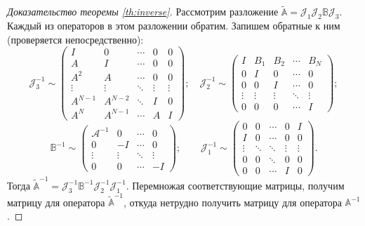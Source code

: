 \begin{proof}[Доказательство теоремы \ref{th:inverse}]
    Рассмотрим разложение $\widetilde{\mathbb A} = \mathcal J_1 \mathcal J_2 \mathbb B \mathcal J_3$. Каждый из операторов в этом разложении обратим. Запишем обратные к ним (проверяется непосредственно):
    \[\mathcal J_3^{-1} \sim \begin{pmatrix}
    I & 0 & \cdots & 0 & 0 \\
    A & I & \cdots & 0 & 0 \\
    A^2 & A & \cdots & 0 & 0 \\
    \vdots & \vdots & \ddots & \vdots & \vdots \\
    A^{N-1} & A^{N-2} & \ddots & I & 0 \\
    A^N & A^{N-1} & \cdots & A & I
   \end{pmatrix}; \quad
   \mathcal J_2^{-1} \sim \begin{pmatrix}
    I & B_1 & B_2 & \cdots & B_N \\
    0 & I & 0 & \cdots &  0 \\
    0 & 0 & I & \cdots &  0 \\
    \vdots & \vdots & \vdots &  \ddots & \vdots \\
    0 & 0 & 0 & \cdots & I
   \end{pmatrix};
   \]
   \[\mathbb B^{-1} \sim \begin{pmatrix}
     \mathcal A^{-1} & 0 & \cdots &  0 \\
    0 & -I  & \cdots &  0 \\
    \vdots & \vdots & \ddots &  \vdots \\
    0 & 0 & \cdots &  -I
   \end{pmatrix}; \quad\quad \mathcal J_1^{-1} \sim \begin{pmatrix}
    0 & 0 & \cdots & 0 &  I \\
    I & 0 & \cdots & 0 &  0 \\[-0.3em]
    \vdots & \ddots & \ddots &  \vdots & \vdots\\[-0.5em]
    0 & 0 & \ddots & 0 & 0 \\
    0 & 0 & \cdots & I & 0
   \end{pmatrix}.\]
   Тогда $\widetilde{\mathbb A}^{-1} = \mathcal J_3^{-1}  \mathbb B^{-1} \mathcal J_2^{-1} \mathcal J_1^{-1}$. Перемножая соответствующие матрицы, получим матрицу для оператора $\widetilde{\mathbb A}^{-1}$, откуда нетрудно получить матрицу для оператора $\mathbb A^{-1}$.
\end{proof}
